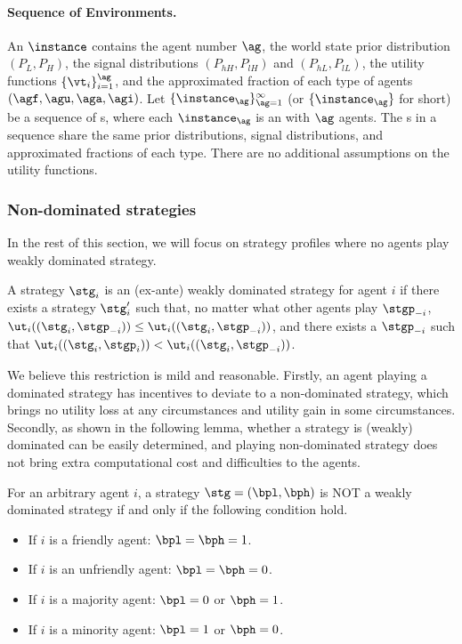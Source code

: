 \paragraph{Sequence of Environments.} An \textinst{} $\instance$  contains the agent number $\ag$, the world state prior distribution $(P_L, P_H)$, the signal distributions $(P_{hH}, P_{lH})$ and $(P_{hL}, P_{lL})$, the utility functions $\{\vt_i\}_{i=1}^\ag$, and the approximated fraction of each type of agents $(\agf, \agu, \aga, \agi)$. Let $\{\instance_\ag\}_{\ag=1}^{\infty}$ (or $\{\instance_\ag\}$ for short) be a sequence of \textinst{}s, where each $\instance_\ag$ is an \textinst{} with $\ag$ agents.
The \textinst{}s in a sequence share the same prior distributions, signal distributions, and approximated fractions of each type. There are no additional assumptions on the utility functions. 

\subsubsection{Non-dominated strategies}

In the rest of this section, we will focus on strategy profiles where no agents play weakly dominated strategy. 

\begin{definition}
    A strategy $\stg_i$ is an (ex-ante) weakly dominated strategy for agent $i$ if there exists a strategy $\stg'_i$ such that, no matter what other agents play $\stgp_{-i}$, $\ut_i((\stg_i, \stgp_{-i})) \le \ut_i((\stg_i, \stgp_{-i}))$, and there exists a $\stgp_{-i}$ such that $\ut_i((\stg_i, \stgp_i)) < \ut_i((\stg_i, \stgp_{-i}))$. 
\end{definition}

We believe this restriction is mild and reasonable. Firstly, an agent playing a dominated strategy has incentives to deviate to a non-dominated strategy, which brings no utility loss at any circumstances and utility gain in some circumstances. Secondly, as shown in the following lemma, whether a strategy is (weakly) dominated can be easily determined, and playing non-dominated strategy does not bring extra computational cost and difficulties to the agents. 

\begin{lemma}
\label{lem:dominated}
    For an arbitrary agent $i$, a strategy $\stg = (\bpl, \bph)$ is NOT a weakly dominated strategy if and only if the following condition hold. 
    \begin{itemize}
        \item If $i$ is a friendly agent: $\bpl = \bph = 1$. 
        \item If $i$ is an unfriendly agent: $\bpl = \bph = 0$. 
        \item If $i$ is a majority agent: $\bpl = 0$ or $\bph = 1$. 
        \item If $i$ is a minority agent: $\bpl = 1$ or $\bph = 0$. 
    \end{itemize}
\end{lemma}

